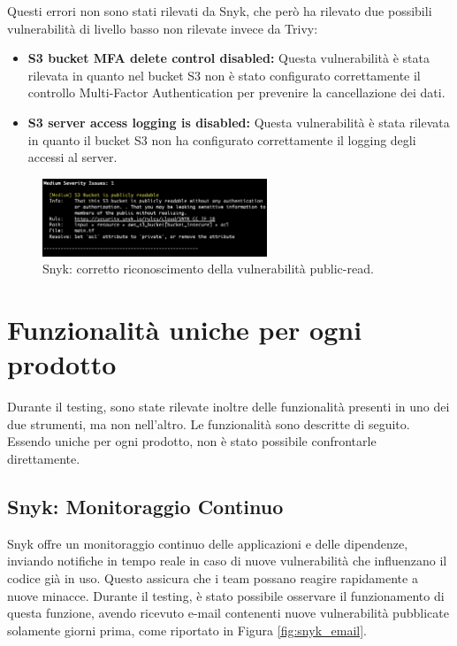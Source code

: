 Questi errori non sono stati rilevati da Snyk, che però ha rilevato due possibili vulnerabilità di livello basso non rilevate invece da Trivy:
\begin{itemize}
   \item \textbf{S3 bucket MFA delete control disabled:} Questa vulnerabilità è stata rilevata in quanto nel bucket S3 non è stato configurato correttamente il controllo Multi-Factor Authentication per prevenire la cancellazione dei dati.
   \item \textbf{S3 server access logging is disabled:} Questa vulnerabilità è stata rilevata in quanto il bucket S3 non ha configurato correttamente il logging degli accessi al server.
\end{itemize}
\begin{figure}[H]
   \centering
   \includegraphics[width=0.6\textwidth]{immagini/capitolo2/snyk_iac.png}
   \caption{Snyk: corretto riconoscimento della vulnerabilità public-read.}
   \label{fig:snyk_iac}
\end{figure}


\section{Funzionalità uniche per ogni prodotto}
Durante il testing, sono state rilevate inoltre delle funzionalità presenti in uno dei due strumenti, ma non nell'altro. Le funzionalità sono descritte di seguito. Essendo uniche per ogni prodotto, non è stato possibile confrontarle direttamente.

\subsection{Snyk: Monitoraggio Continuo}
Snyk offre un monitoraggio continuo delle applicazioni e delle dipendenze, inviando notifiche in tempo reale in caso di nuove vulnerabilità che influenzano il codice già in uso. Questo assicura che i team possano reagire rapidamente a nuove minacce. Durante il testing, è stato possibile osservare il funzionamento di questa funzione, avendo ricevuto e-mail contenenti nuove vulnerabilità pubblicate solamente giorni prima, come riportato in Figura \ref{fig:snyk_email}.

